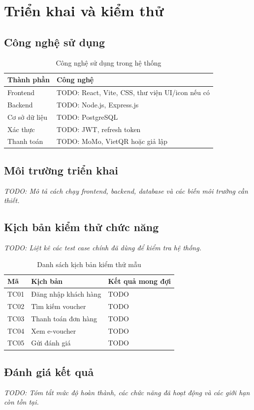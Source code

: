 \section{Triển khai và kiểm thử}

\subsection{Công nghệ sử dụng}
\begin{table}[H]
\centering
\begin{tabular}{p{} p{}}
\toprule
\textbf{Thành phần} & \textbf{Công nghệ} \\
\midrule
Frontend & TODO: React, Vite, CSS, thư viện UI/icon nếu có \\
Backend & TODO: Node.js, Express.js \\
Cơ sở dữ liệu & TODO: PostgreSQL \\
Xác thực & TODO: JWT, refresh token \\
Thanh toán & TODO: MoMo, VietQR hoặc giả lập \\
\bottomrule
\end{tabular}
\caption{Công nghệ sử dụng trong hệ thống}
\end{table}

\subsection{Môi trường triển khai}
\textit{TODO: Mô tả cách chạy frontend, backend, database và các biến môi trường cần thiết.}

\subsection{Kịch bản kiểm thử chức năng}
\textit{TODO: Liệt kê các test case chính đã dùng để kiểm tra hệ thống.}

\begin{table}[H]
\centering
\begin{tabular}{p{} p{} p{}}
\toprule
\textbf{Mã} & \textbf{Kịch bản} & \textbf{Kết quả mong đợi} \\
\midrule
TC01 & Đăng nhập khách hàng & TODO \\
TC02 & Tìm kiếm voucher & TODO \\
TC03 & Thanh toán đơn hàng & TODO \\
TC04 & Xem e-voucher & TODO \\
TC05 & Gửi đánh giá & TODO \\
\bottomrule
\end{tabular}
\caption{Danh sách kịch bản kiểm thử mẫu}
\end{table}

\subsection{Đánh giá kết quả}
\textit{TODO: Tóm tắt mức độ hoàn thành, các chức năng đã hoạt động và các giới hạn còn tồn tại.}

